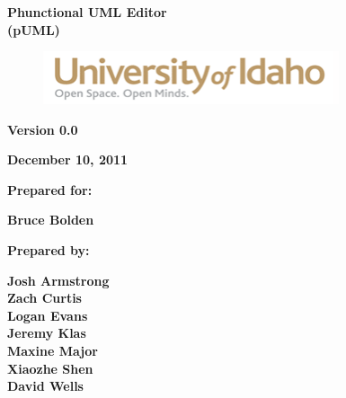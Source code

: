 \documentclass[twoside,letterpaper]{article}
\begin{document}
\bigskip

{\centering{}\bfseries\color{black}
Phunctional UML Editor
\\(pUML)
\par}


\bigskip


\bigskip


\bigskip

{\centering \par}

\begin{figure}
\centering
\includegraphics[width=3.4354in,height=0.6126in]{SSDDTemplateA2-img1.png}
\end{figure}

\bigskip


\bigskip


\bigskip


\bigskip

{\centering{}\bfseries\color{black}
Version 0.0
\par}

{\centering{}\bfseries\color{black}
December 10, 2011
\par}


\bigskip


\bigskip

{\centering{}\bfseries\color{black}
Prepared for:
\par}

{\centering{}\bfseries\color{black}
Bruce Bolden
\par}


\bigskip


\bigskip

{\centering{}\bfseries\color{black}
Prepared by:
\par}

{\centering{}\bfseries\color{black}
Josh Armstrong
\\Zach Curtis
\\Logan Evans
\\Jeremy Klas
\\Maxine Major
\\Xiaozhe Shen
\\David Wells
\par}
\end{document}
